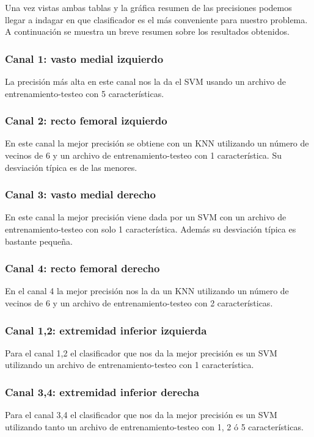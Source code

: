 \newpage
Una vez vistas ambas tablas y la gráfica resumen de las precisiones podemos llegar a indagar en que clasificador es el más conveniente para nuestro problema. A continuación se muestra un breve resumen sobre los resultados obtenidos.
\subsubsection{Canal 1: vasto medial izquierdo}
La precisión más alta en este canal nos la da el SVM usando un archivo de entrenamiento-testeo con 5 características. 

\subsubsection{ Canal 2: recto femoral izquierdo}
En este canal la mejor precisión se obtiene con un KNN utilizando un número de vecinos de 6 y un archivo de entrenamiento-testeo con 1 característica. Su desviación típica es de las menores.

\subsubsection{Canal 3: vasto medial derecho}
En este canal la mejor precisión viene dada por un SVM con un archivo de entrenamiento-testeo con solo 1 característica. Además su desviación típica es bastante pequeña.

\subsubsection{Canal 4: recto femoral derecho}
En el canal 4 la mejor precisión nos la da un KNN utilizando un número de vecinos de 6 y un archivo de entrenamiento-testeo con 2 características.

\subsubsection{Canal 1,2: extremidad inferior izquierda}
Para el canal 1,2 el clasificador que nos da la mejor precisión es un SVM utilizando un archivo de entrenamiento-testeo con 1 característica.

\subsubsection{Canal 3,4: extremidad inferior derecha}
Para el canal 3,4 el clasificador que nos da la mejor precisión es un SVM utilizando tanto un archivo de entrenamiento-testeo con 1, 2 ó 5 características.

